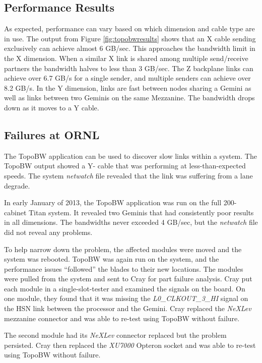 \documentclass[10pt, conference, compsocconf]{IEEEtran}
\begin{document}

\subsection{Performance Results}

As expected, performance can vary based on which dimension and cable type are
in use.  The output from Figure \ref{fig:topobwresults} shows that an X cable
sending exclusively can achieve almost 6 GB/sec.  This approaches the bandwidth
limit in the X dimension.  When a similar X link is shared among multiple
send/receive partners the bandwidth halves to less than 3 GB/sec.  The Z
backplane links can achieve over 6.7 GB/s for a single sender, and multiple
senders can achieve over 8.2 GB/s.  In the Y dimension, links are fast between
nodes sharing a Gemini as well as links between two Geminis on the same
Mezzanine.  The bandwidth drops down as it moves to a Y cable.

\subsection{Failures at ORNL}

The TopoBW application can be used to discover slow links within a system.  The
TopoBW output showed a Y- cable that was performing at less-than-expected
speeds.  The system \emph{netwatch} file revealed that the link was suffering
from a lane degrade.

In early January of 2013, the TopoBW application was run on the full
200-cabinet Titan system.  It revealed two Geminis that had consistently poor
results in all dimensions.  The bandwidths never exceeded 4 GB/sec, but the
\emph{netwatch} file did not reveal any problems.

To help narrow down the problem, the affected modules were moved and the system
was rebooted.  TopoBW was again run on the system, and the performance issues
``followed'' the blades to their new locations.  The modules were pulled from
the system and sent to Cray for part failure analysis.  Cray put each module in
a single-slot-tester and examined the signals on the board.  On one module,
they found that it was missing the \emph{L0\_CLKOUT\_3\_HI} signal on the HSN
link between the processor and the Gemini.  Cray replaced the \emph{NeXLev}
mezzanine connector and was able to re-test using TopoBW without failure.

The second module had its \emph{NeXLev} connector replaced but the problem
persisted.  Cray then replaced the \emph{XU7000} Opteron socket and was able to
re-test using TopoBW without failure.
\end{document}
